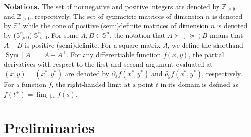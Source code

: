 \documentclass[12pt]{article}
\def\T{\textnormal{T}}
\DeclareMathOperator{\He}{Sym}
\def\T{\intercal}
\begin{document}
\noindent \textbf{Notations.} The set of nonnegative and positive integers are denoted by $\mathbb{Z}_{\ge0}$ and $\mathbb{Z}_{>0}$, respectively. The set of symmetric matrices of dimension $n$ is denoted by  $\mathbb{S}^n$ while the cone of positive (semi)definite matrices of dimension $n$ is denoted by ($\mathbb{S}^n_{\succeq0}$) $\mathbb{S}_{\succ0}^n$. For some $A,B\in\mathbb{S}^n$, the notation that $A\succ(\succeq)B$ means that $A-B$ is positive (semi)definite. %
For a square matrix $A$, we define the shorthand $\He[A]=A+A^{\T}$. For any differentiable function $f(x,y)$, the partial derivatives with respect to the first and second argument evaluated at $(x,y)=(x^*,y^*)$ are denoted by $\partial_x f(x^*,y^*)$ and $\partial_y f(x^*,y^*)$, respectively. For a function $f$, the right-handed limit at a point $t$ in its domain is defined as $\textstyle f(t^+)=\lim_{s\downarrow t}f(s)$.


\section{Preliminaries}\label{sec:prel}
\end{document}
